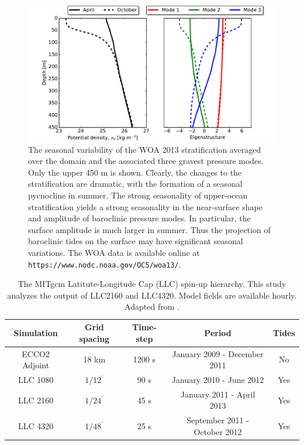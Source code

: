 \documentclass[draft,grl]{agutexSI}
\begin{document}
 \begin{figure}
    \begin{center}
      \includegraphics[width=40pc]{figs/fig_s3.pdf}
   \caption{The seasonal variability of the WOA 2013 \citep{levitus_etal2013} stratification averaged  over
   the domain and the associated three gravest pressure modes. Only the upper 450 m is shown.
   Clearly, the changes to the stratification
   are dramatic, with the formation of a seasonal pycnocline in summer. The strong
   seasonality of upper-ocean stratification yields a strong seasonality in the
   near-surface shape and amplitude of baroclinic pressure modes.
   In particular, the surface amplitude is much larger in summer. Thus the projection
   of baroclinic tides on the surface may have significant seasonal variations. The WOA data is
   available online at \texttt{https://www.nodc.noaa.gov/OC5/woa13/}.}
   \label{figS3}
   \end{center}
 \end{figure}


 \begin{table}
 \label{tab:llc}
 \caption{\small The MITgcm Latitute-Longitude Cap (LLC) spin-up hierarchy. This study analyzes
          the output of LLC2160 and LLC4320. Model fields are available hourly.
          Adapted from \cite{rocha_etal2016}.}
 \begin{center}
 \begin{tabular}{ | c | c | c | c | c |}
 \hline
 Simulation & Grid spacing & Time-step & Period  & Tides \\ \hline
 ECCO2 Adjoint & 18 km & 1200 s & January 2009 - December 2011 & No\\
 LLC 1080   & $1/12^{^\circ}$ & 90 s & January 2010 - June 2012 & Yes \\
 LLC 2160   &  $1/24^{^\circ}$ & 45 s  & January 2011 - April 2013 & Yes\\
 LLC 4320   &  $1/48^{^\circ}$ & 25 s & September 2011 - October 2012 & Yes \\
 \hline
 \end{tabular}
 \end{center}
 \end{table}
\end{document}
